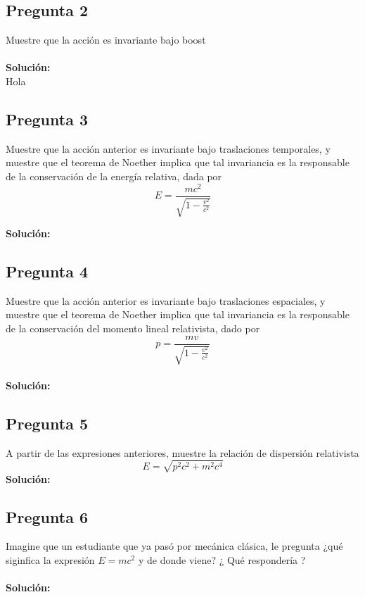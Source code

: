 \documentclass[../main.tex]{subfiles}
\begin{document}
\subsection{Pregunta 2}
Muestre que la acción es invariante bajo boost \\
\\
\textbf{Solución:} 
\\
Hola
\subsection{Pregunta 3}
Muestre que la acción anterior es invariante bajo traslaciones temporales, y muestre que el teorema de Noether implica que tal invariancia es la responsable de la conservación de la energía relativa, dada por
\begin{equation}
  E=\frac{mc^2}{\sqrt{1-\frac{v^2}{c^2}}}
\end{equation}  

\textbf{Solución:}
\\  

\subsection{Pregunta 4}
Muestre que la acción anterior es invariante bajo traslaciones espaciales, y muestre que el teorema de Noether implica que tal invariancia es la responsable de la conservación del momento lineal relativista, dado por
\begin{equation}
  p=\frac{mv}{\sqrt{1-\frac{v^2}{c^2}}}
\end{equation}
\\
\textbf{Solución:} 
\\
\subsection{Pregunta 5}
A partir de las expresiones anteriores, muestre la relación de dispersión relativista
\begin{equation}
  E=\sqrt{p^2c^2+m^2c^4}
\end{equation}
\textbf{Solución:}
\\
\subsection{Pregunta 6}
Imagine que un estudiante que ya pasó por mecánica clásica, le pregunta ¿qué siginfica la expresión $E=mc^2$ y de donde viene? ¿ Qué respondería ?  \\
\\
\textbf{Solución:}
\\



 
\end{document}
